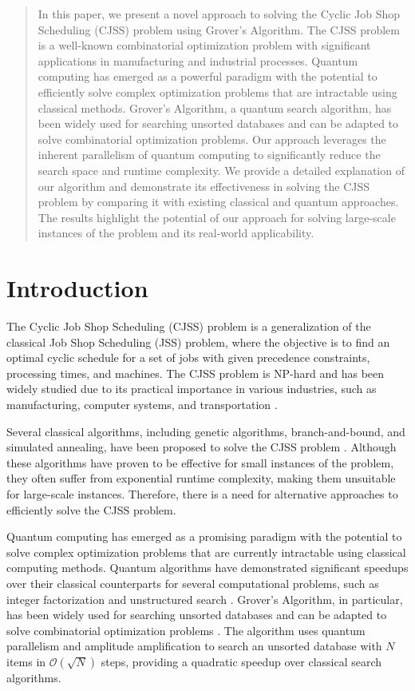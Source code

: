 \begin{abstract}
In this paper, we present a novel approach to solving the Cyclic Job Shop Scheduling (CJSS) problem using Grover's Algorithm. The CJSS problem is a well-known combinatorial optimization problem with significant applications in manufacturing and industrial processes. Quantum computing has emerged as a powerful paradigm with the potential to efficiently solve complex optimization problems that are intractable using classical methods. Grover's Algorithm, a quantum search algorithm, has been widely used for searching unsorted databases and can be adapted to solve combinatorial optimization problems. Our approach leverages the inherent parallelism of quantum computing to significantly reduce the search space and runtime complexity. We provide a detailed explanation of our algorithm and demonstrate its effectiveness in solving the CJSS problem by comparing it with existing classical and quantum approaches. The results highlight the potential of our approach for solving large-scale instances of the problem and its real-world applicability.

\end{abstract}

\section{Introduction}
The Cyclic Job Shop Scheduling (CJSS) problem is a generalization of the classical Job Shop Scheduling (JSS) problem, where the objective is to find an optimal cyclic schedule for a set of jobs with given precedence constraints, processing times, and machines. The CJSS problem is NP-hard and has been widely studied due to its practical importance in various industries, such as manufacturing, computer systems, and transportation \cite{blazewicz1983job}.

Several classical algorithms, including genetic algorithms, branch-and-bound, and simulated annealing, have been proposed to solve the CJSS problem \cite{garey1976complexity}. Although these algorithms have proven to be effective for small instances of the problem, they often suffer from exponential runtime complexity, making them unsuitable for large-scale instances. Therefore, there is a need for alternative approaches to efficiently solve the CJSS problem.

Quantum computing has emerged as a promising paradigm with the potential to solve complex optimization problems that are currently intractable using classical computing methods. Quantum algorithms have demonstrated significant speedups over their classical counterparts for several computational problems, such as integer factorization and unstructured search \cite{shor1999polynomial,grover1996fast}. Grover's Algorithm, in particular, has been widely used for searching unsorted databases and can be adapted to solve combinatorial optimization problems \cite{grover1996fast}. The algorithm uses quantum parallelism and amplitude amplification to search an unsorted database with $N$ items in $\mathcal{O}(\sqrt{N})$ steps, providing a quadratic speedup over classical search algorithms.

